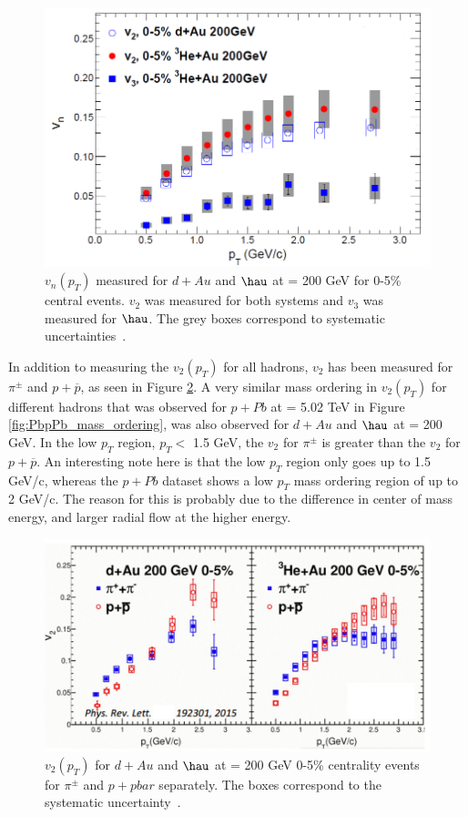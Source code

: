\begin{figure}[h!]
\begin{center}
\includegraphics[width=0.75\linewidth]{figs/hedau_v2_v3.PNG}
\caption{ $v_n(p_T)$ measured for $d+Au$ and $\hau$ at \sqsn = 200 GeV for 0-5\% central events. $v_2$ was measured for both systems and $v_3$ was measured for $\hau$. The grey boxes correspond to systematic uncertainties~\cite{PhysRevLett.115.142301}.}
\label{fig:dhau_v2_v3}
\end{center}
\end{figure}

In addition to measuring the $v_2(p_T)$ for all hadrons, $v_2$ has been measured for $\pi^{\pm}$ and $p+\overline{p}$, as seen in Figure \ref{fig:dhau_mass_ordering}. A very similar mass ordering in $v_2(p_T)$ for different hadrons that was observed for $p+Pb$ at \sqsn = 5.02 TeV  in Figure \ref{fig:PbpPb_mass_ordering}, was also observed for $d+Au$ and $\hau$ at \sqsn =  200 GeV. In the low $p_T$ region, $ p_T <$ 1.5 GeV, the $v_2$ for $\pi^{\pm}$ is greater than the $v_2$ for $p+\overline{p}$. An interesting note here is that the low $p_T$ region only goes up to 1.5 GeV/c, whereas the $p+Pb$ dataset shows a low $p_T$ mass ordering region of up to 2 GeV/c. The reason for this is probably due to the difference in center of mass energy, and larger radial flow at the higher energy.

\begin{figure}[h!]
\begin{center}
\includegraphics[width=0.75\linewidth]{figs/dhau_mass_ordering_phenix.PNG}
\caption{ $v_2(p_T)$ for $d+Au$ and $\hau$ at \sqsn = 200 GeV 0-5\% centrality events for $\pi^{\pm}$ and $p+pbar$ separately. The boxes correspond to the systematic uncertainty~\cite{PhysRevLett.115.142301}.}
\label{fig:dhau_mass_ordering}
\end{center}
\end{figure}

